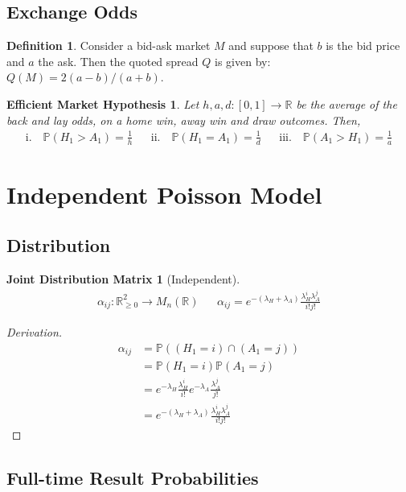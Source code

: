 \documentclass[a4paper,11pt,oneside]{book}
\theoremstyle{plain}
\newtheorem*{emh}{Efficient Market Hypothesis}
\newtheorem*{jdm}{Joint Distribution Matrix}
\theoremstyle{definition}
\newtheorem{defn}{Definition}[section]
\begin{document}
\subsection{Exchange Odds}
\begin{defn}
Consider a bid-ask market $M$ and suppose that $b$ is the bid price and $a$ the ask. Then the quoted spread $Q$ is given by:
$Q(M)=2(a-b)/(a+b)$.
\end{defn}
\begin{emh}
Let $h,a,d:[0,1]\rightarrow \mathbb{R}$ be the average of the back and lay odds, on a home win, away win and draw outcomes. Then,
\begin{align*}
\text{i.} \quad \mathbb{P}(H_1>A_1)=\frac{1}{h} && \text{ii.} \quad\mathbb{P}(H_1=A_1)=\frac{1}{d} && \text{iii.} \quad\mathbb{P}(A_1>H_1)=\frac{1}{a}
\end{align*}
\end{emh}
\section{Independent Poisson Model}
\subsection{Distribution}
\begin{jdm}[Independent]
\begin{align*}
\alpha_{ij}: \mathbb{R}^2_{\ge 0} \rightarrow M_n(\mathbb{R}) && \alpha_{ij}=e^{-(\lambda_H+\lambda_A)}\frac{\lambda_H^i\lambda_A^j}{i!j!}
\end{align*}
\end{jdm}
\begin{proof}[Derivation]
\begin{align*}
\alpha_{ij}&=\mathbb{P}((H_1=i)\cap (A_1=j))\\
&=\mathbb{P}(H_1=i)\mathbb{P}(A_1=j)\\
&=e^{-\lambda_H}\frac{\lambda_H^i}{i!}e^{-\lambda_A}\frac{\lambda_A^j}{j!}\\
&=e^{-(\lambda_H+\lambda_A)}\frac{\lambda_H^i\lambda_A^j}{i!j!}
\end{align*}
\end{proof}
\subsection{Full-time Result Probabilities}
\end{document}

